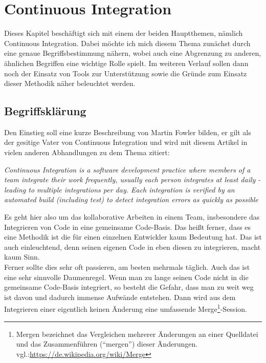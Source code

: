 \pagebreak
\section{Continuous Integration}
Dieses Kapitel beschäftigt sich mit einem der beiden Hauptthemen, nämlich Continuous Integration. Dabei möchte ich mich diesem Thema zunächst durch eine genaue Begriffsbestimmung nähern, wobei auch eine Abgrenzung zu anderen, ähnlichen Begriffen eine wichtige Rolle spielt. Im weiteren Verlauf sollen dann noch der Einsatz von Tools zur Unterstützung sowie die Gründe zum Einsatz dieser Methodik näher beleuchtet werden.\\
\subsection{Begriffsklärung}
Den Einstieg soll eine kurze Beschreibung von Martin Fowler bilden, er gilt als der gesitige Vater von Continuous Integration und wird mit diesem Artikel in vielen anderen Abhandlungen zu dem Thema zitiert:
\begin{center}
	\textit{
	Continuous Integration is a software development practice where members of a team integrate their work frequently, usually each person integrates at least daily - leading to multiple integrations per day. Each integration is verified by an automated build (including test) to detect integration errors as quickly as possible} \cite{fowler-CI}
\end{center}
Es geht hier also um das kollaborative Arbeiten in einem Team, insbesondere das Integrieren von Code in eine gemeinsame Code-Basis. Das heißt ferner, dass es eine Methodik ist die für einen einzelnen Entwickler kaum Bedeutung hat. Das ist auch einleuchtend, denn seinen eigenen Code in eben diesen zu integrieren, macht kaum Sinn. \\
Ferner sollte dies sehr oft passieren, am besten mehrmals täglich. Auch das ist eine sehr sinnvolle Daumenregel. Wenn man zu lange seinen Code nicht in die gemeinsame Code-Basis integriert, so besteht die Gefahr, dass man zu weit weg ist davon und dadurch immense Aufwände entstehen. Dann wird aus dem Integrieren einer eigentlich keinen Änderung eine umfassende Merge\footnote{Mergen bezeichnet das Vergleichen mehrerer Änderungen an einer Quelldatei und das Zusammenführen ("`mergen"') dieser Änderungen. vgl.:\url{https://de.wikipedia.org/wiki/Merge}}-Session.\\
